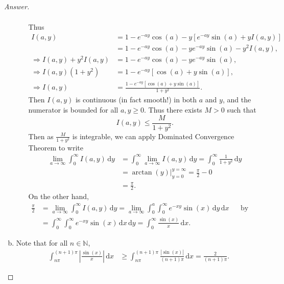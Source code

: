 \documentclass[12pt]{article}
\newcommand{\n}{\mathbb{N}}
\newcommand\paren[1]{\left( #1 \right)}
\newcommand{\sqbrack}[1]{\left [ #1 \right ]}
\newcommand{\abs}[1]{\left | #1 \right |}
\renewcommand{\i}[4]{\int_{#1}^{#2} {#3} \, \mathrm{d} {#4} }
\theoremstyle{definition}
\begin{document}
\begin{proof}[Answer]
\begin{enumerate}[(a)]
\begin{enumerate}[(i)]
\begin{align*}
            \end{align*}
            Thus 
            \begin{align*}
                I(a,y) & = 1 - e^{-ay} \cos(a) - y \sqbrack{ e^{-ay} \sin(a) + y I(a,y) } \\ 
                & = 1 - e^{-ay} \cos(a) - y e^{-ay} \sin(a) - y^2 I(a,y) , \\ 
                \Rightarrow I(a,y) + y^2 I(a,y) & = 1 - e^{-ay} \cos(a) - y e^{-ay} \sin(a) , \\ 
                \Rightarrow I(a,y) \paren{ 1 + y^2 } & = 1 - e^{-ay} \sqbrack{ \cos(a) + y \sin(a) } , \\ 
                \Rightarrow I(a,y) & = \frac{ 1 - e^{-ay} \sqbrack{ \cos(a) + y \sin(a) } }{ 1 + y^2 } . 
            \end{align*}
            Then $I(a,y)$ is continuous (in fact smooth!) in both $a$ and $y$, and the numerator is bounded for all $a , y \geq 0$. 
            Thus there exists $M > 0$ such that 
            \[
                I(a,y) \leq \frac{M}{1 + y^2} .
            \]
            Then as $\frac{M}{1 + y^2}$ is integrable, we can apply Dominated Convergence Theorem to write 
            \begin{align*}
                \lim\limits_{a \to \infty} \i{0}{\infty}{I(a,y)}{y} & = \i{0}{\infty}{ \lim\limits_{a \to \infty} I(a,y) }{y} = \i{0}{\infty}{\frac{1}{1 + y^2}}{y} \\ 
                & = \left. \arctan(y) \right|_{y = 0}^{y = \infty} = \frac{\pi}{2} - 0 \\ 
                & = \frac{\pi}{2} . 
            \end{align*}
            On the other hand, 
            \begin{align*}
                \frac{\pi}{2} & = \lim\limits_{a \to \infty} \i{0}{\infty}{I(a,y)}{y} = \lim\limits_{a \to \infty} \i{0}{a}{ \i{0}{\infty}{e^{-xy} \sin(x)}{y} }{x} && \text{by Fubini} \\ 
                & = \i{0}{\infty}{ \i{0}{\infty}{ e^{-xy} \sin(x) }{x} }{y} = \i{0}{\infty}{ \frac{\sin(x)}{x} }{x} . 
            \end{align*}
        \end{enumerate}
        \item Note that for all $n \in \n$,
        \begin{align*}
            \i{n\pi}{(n+1)\pi}{ \abs{ \frac{\sin(x)}{x} } }{x} & \geq \i{n\pi}{(n+1)\pi}{ { \frac{\abs{ \sin(x) }}{(n+1)\pi} } }{x} = \frac{2}{(n+1)\pi} .

\end{align*}
\end{enumerate}
\end{proof}
\end{document}
